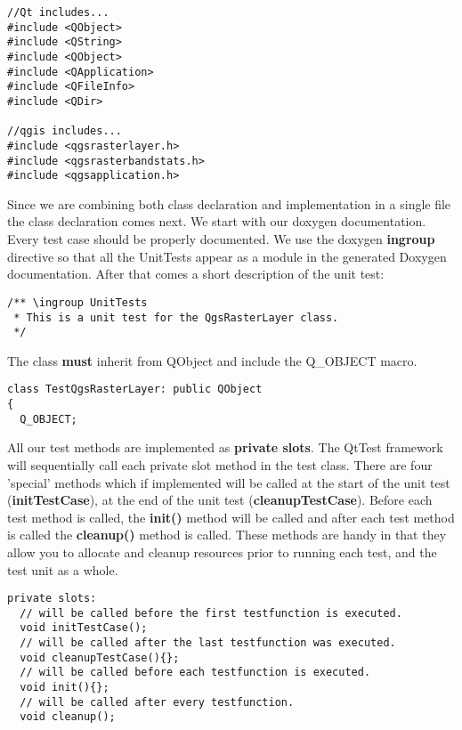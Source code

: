 \begin{verbatim}
//Qt includes...
#include <QObject>
#include <QString>
#include <QObject>
#include <QApplication>
#include <QFileInfo>
#include <QDir>

//qgis includes...
#include <qgsrasterlayer.h> 
#include <qgsrasterbandstats.h> 
#include <qgsapplication.h>
\end{verbatim}

Since we are combining both class declaration and implementation in a single
file the class declaration comes next. We start with our doxygen documentation.
Every test case should be properly documented. We use the doxygen \textbf{ingroup}
directive so that all the UnitTests appear as a module in the generated Doxygen
documentation. After that comes a short description of the unit test:

\begin{verbatim}
/** \ingroup UnitTests
 * This is a unit test for the QgsRasterLayer class.
 */
\end{verbatim}

The class \textbf{must} inherit from QObject and include the Q\_OBJECT macro.

\begin{verbatim}
class TestQgsRasterLayer: public QObject
{
  Q_OBJECT;
\end{verbatim}

All our test methods are implemented as \textbf{private slots}. The QtTest framework
will sequentially call each private slot method in the test class. There are
four 'special' methods which if implemented will be called at the start of the
unit test (\textbf{initTestCase}), at the end of the unit test
(\textbf{cleanupTestCase}).  Before each test method is called, the \textbf{init()}
method will be called and after each test method is called the \textbf{cleanup()}
method is called. These methods are handy in that they allow you to allocate
and cleanup resources prior to running each test, and the test unit as a whole.

\begin{verbatim}
private slots:
  // will be called before the first testfunction is executed.
  void initTestCase();
  // will be called after the last testfunction was executed.
  void cleanupTestCase(){};
  // will be called before each testfunction is executed.
  void init(){};
  // will be called after every testfunction.
  void cleanup();
\end{verbatim}

